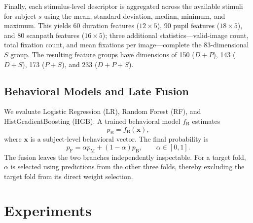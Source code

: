 \documentclass[conference,a4paper]{IEEEtran}
\begin{document}
Finally, each stimulus-level descriptor is aggregated across the available stimuli for subject $s$ using the mean, standard deviation, median, minimum, and maximum. This yields 60 duration features ($12\times5$), 90 pupil features ($18\times5$), and 80 scanpath features ($16\times5$); three additional statistics—valid-image count, total fixation count, and mean fixations per image—complete the 83-dimensional $S$ group. The resulting feature groups have dimensions of 150 ($D+P$), 143 ($D+S$), 173 ($P+S$), and 233 ($D+P+S$).

\subsection{Behavioral Models and Late Fusion}
We evaluate Logistic Regression (LR), Random Forest (RF), and HistGradientBoosting (HGB). A trained behavioral model $f_{\mathrm{B}}$ estimates
\begin{equation}
p_{\mathrm{B}}=f_{\mathrm{B}}(\mathbf{x}),
\end{equation}
where $\mathbf{x}$ is a subject-level behavioral vector. The final probability is
\begin{equation}
p_{\mathrm{F}}=\alpha p_{\mathrm{M}}+(1-\alpha)p_{\mathrm{B}},\qquad \alpha\in[0,1].
\label{eq:fusion}
\end{equation}
The fusion leaves the two branches independently inspectable. For a target fold, $\alpha$ is selected using predictions from the other three folds, thereby excluding the target fold from its direct weight selection.

\section{Experiments}
\end{document}
